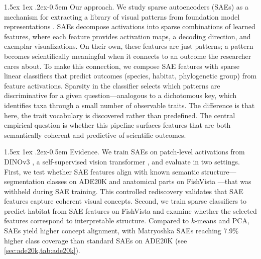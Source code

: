 \documentclass{article}
\makeatletter
\renewcommand{\paragraph}{%
  \@startsection{paragraph}{4}%
  {\z@}{1.5ex \@plus 1ex \@minus .2ex}{-0.5em}%
  {\normalfont\normalsize\bfseries}%
}
\theoremstyle{plain}
\theoremstyle{definition}
\theoremstyle{remark}
\makeatother
\begin{document}
\paragraph{Our approach.}
We study sparse autoencoders (SAEs) as a mechanism for extracting a library of visual patterns from foundation model representations \citep{bricken2023monosemanticity,templeton2024scaling,cunningham2023sparse,gao2025scaling}.
SAEs decompose activations into sparse combinations of learned features, where each feature provides activation maps, a decoding direction, and exemplar visualizations.
On their own, these features are just patterns; a pattern becomes scientifically meaningful when it connects to an outcome the researcher cares about.
To make this connection, we compose SAE features with sparse linear classifiers that predict outcomes (species, habitat, phylogenetic group) from feature activations.
Sparsity in the classifier selects which patterns are discriminative for a given question—analogous to a dichotomous key, which identifies taxa through a small number of observable traits.
The difference is that here, the trait vocabulary is discovered rather than predefined.
The central empirical question is whether this pipeline surfaces features that are both semantically coherent and predictive of scientific outcomes.

\paragraph{Evidence.}
We train SAEs on patch-level activations from DINOv3 \citep{simeoni2025dinov3}, a self-supervised vision transformer \citep{dosovitskiy2020vit}, and evaluate in two settings.
First, we test whether SAE features align with known semantic structure—segmentation classes on ADE20K \citep{zhou2017ade20k} and anatomical parts on FishVista \citep{mehrab2024fishvista,fishvistadataset}—that was withheld during SAE training.
This controlled rediscovery validates that SAE features capture coherent visual concepts.
Second, we train sparse classifiers to predict habitat from SAE features on FishVista and examine whether the selected features correspond to interpretable structure.
Compared to $k$-means and PCA, SAEs yield higher concept alignment, with Matryoshka SAEs \citep{bussmann2025matryoshka} reaching \num{7.9}\% higher class coverage than standard SAEs on ADE20K (see \cref{sec:ade20k,tab:ade20k}).
\end{document}
